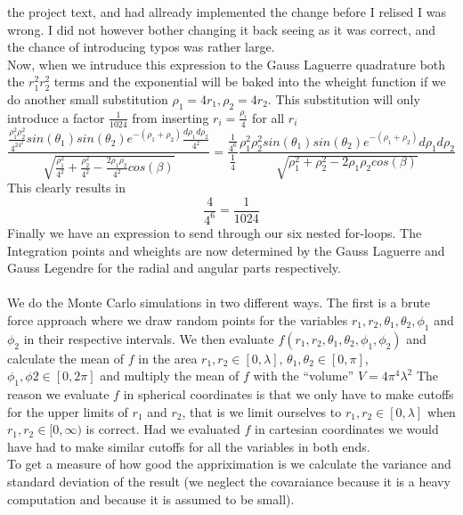 \documentclass[a4paper,english, 10pt, twoside]{article}
\begin{document}
the project text, and had allready implemented the change before I relised I was wrong. I did not however bother changing it back 
seeing as it was correct, and the chance of introducing typos was rather large.\\
Now, when we intruduce this expression to the Gauss Laguerre quadrature both the $r_1^2r_2^2$ terms and the exponential will be 
baked into the wheight function if we do another small substitution $\rho_1 = 4r_1, \rho_2 = 4r_2$. This substitution will only 
introduce a factor $\frac{1}{1024}$ from inserting $r_i = \frac{\rho_i}{4}$ for all $r_i$ 
$$
\frac{\frac{\rho_1^2\rho_2^2}{4^24^2}sin(\theta_1)sin(\theta_2)e^{-(\rho_1+\rho_2)}\frac{d\rho_1d\rho_2}{4^2}}
{\sqrt{\frac{\rho_1^2}{4^2}+\frac{\rho_2^2}{4^2}-\frac{2\rho_1\rho_2}{4^2}cos(\beta)}} = 
\frac{\frac{1}{4^6}}{\frac{1}{4}}\frac{\rho_1^2\rho_2^2sin(\theta_1)sin(\theta_2)e^{-(\rho_1+\rho_2)}d\rho_1d\rho_2}
{\sqrt{\rho_1^2+\rho_2^2-2\rho_1\rho_2cos(\beta)}}
$$
This clearly results in 
$$
\frac{4}{4^6} = \frac{1}{1024}
$$
Finally we have an expression to send through our six nested for-loops. The Integration points and wheights are now determined 
by the Gauss Laguerre and Gauss Legendre for the radial and angular parts respectively.\\ \\

We do the Monte Carlo simulations in two different ways. The first is a brute force approach where we draw random points for the 
variables $r_1, r_2, \theta_1 , \theta_2 , \phi_1$ and $\phi_2$ in their respective intervals. We then evaluate 
$f(r_1, r_2, \theta_1 , \theta_2 , \phi_1, \phi_2)$ and calculate the mean of $f$ in the area $r_1,r_2 \in [0,\lambda]$, 
$\theta_1,\theta_2 \in [0,\pi]$, $\phi_1,\phi2 \in [0,2\pi]$ and multiply the mean of $f$ with the ``volume'' $V = 4\pi^4\lambda^2$
The reason we evaluate $f$ in spherical coordinates is that we only have to make cutoffs for the upper limits of $r_1$ and $r_2$, 
that is we limit ourselves to $r_1,r_2 \in [0,\lambda]$ when $r_1,r_2 \in [0,\infty)$ is correct. Had we evaluated $f$ in cartesian 
coordinates we would have had to make similar cutoffs for all the variables in both ends.\\
To get a measure of how good the appriximation is we calculate the variance and standard deviation of the result (we neglect the 
covaraiance because it is a heavy computation and because it is assumed to be small).
\end{document}

